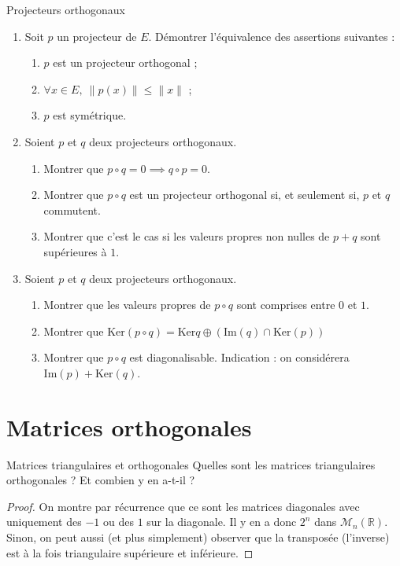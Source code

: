 \documentclass[french,a4paper]{article}
\newcommand{\R}{\mathbb{R}}
\renewcommand{\ker}{\text{Ker}}
\newcommand{\im}{\text{Im}}
\theoremstyle{plain}
\theoremstyle{definition}
\theoremstyle{remark}
\begin{document}
\begin{ex}[Châteaux]{Projecteurs orthogonaux}
	\begin{enumerate}
		\item Soit $p$ un projecteur de $E$. Démontrer l'équivalence des assertions suivantes : 
		\begin{enumerate}[label=(\roman*)]
			\item $p$ est un projecteur orthogonal ;
			\item $\forall x\in E,\ \lVert p(x)\rVert\leqslant\lVert x\rVert$ ;
			\item $p$ est symétrique.
		\end{enumerate}
		\item Soient $p$ et $q$ deux projecteurs orthogonaux.
		\begin{enumerate}[label=\alph*.]
			\item Montrer que $p\circ q=0\implies q\circ p=0$.
			\item Montrer que $p\circ q$ est un projecteur orthogonal si, et seulement si, $p$ et $q$ commutent.
			\item Montrer que c'est le cas si les valeurs propres non nulles de $p+q$ sont supérieures à $1$.
		\end{enumerate}
		\item Soient $p$ et $q$ deux projecteurs orthogonaux.
		\begin{enumerate}[label=\alph*.]
			\item Montrer que les valeurs propres de $p\circ q$ sont comprises entre $0$ et $1$.
			\item Montrer que $\ker(p\circ q)=\ker q\oplus(\im(q)\cap\ker(p))$
			\item Montrer que $p\circ q$ est diagonalisable. Indication : on considérera $\im(p)+\ker(q)$.
		\end{enumerate}
	\end{enumerate}
\end{ex}

\section{Matrices orthogonales}

\begin{ex}{Matrices triangulaires et orthogonales}
	Quelles sont les matrices triangulaires orthogonales ? Et combien y en a-t-il ?
\end{ex}
\begin{proof}
	On montre par récurrence que ce sont les matrices diagonales avec uniquement des $-1$ ou des $1$ sur la diagonale. Il y en a donc $2^n$ dans $\mathcal{M}_n(\R)$. Sinon, on peut aussi (et plus simplement) observer que la transposée (l'inverse) est à la fois triangulaire supérieure et inférieure.
\end{proof}
\end{document}

